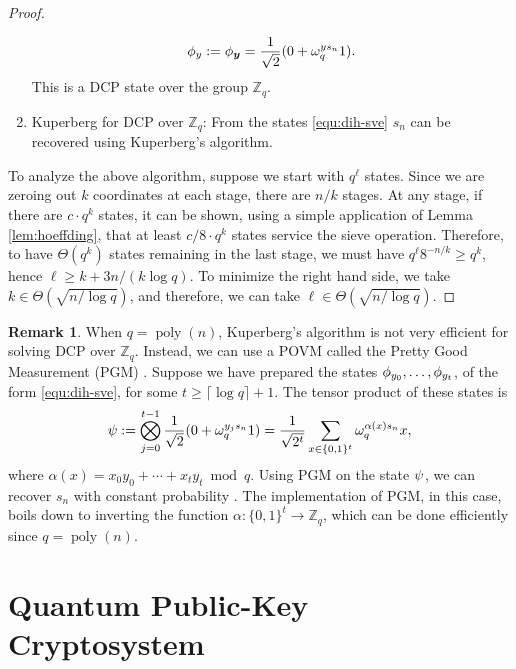 \documentclass[11pt]{article}
\theoremstyle{plain}
\theoremstyle{definition}
\newtheorem*{remark}{Remark}
\DeclareMathOperator{\poly}{poly}
\let\ket\relax
\DeclarePairedDelimiter{\ket}{\lvert}{\rangle}
\def\Z{\mathbb{Z}}
\begin{document}
\begin{proof}
\begin{enumerate}[leftmargin = *, font = \bfseries]
    \begin{equation}
        \label{equ:dih-sve}
        \ket{\phi_y} := \ket{\phi_{\bm{y}}} = \frac{1}{\sqrt{2}}(\ket{0} + \omega_q^{ys_n}\ket{1}).
    \end{equation}
    This is a DCP state over the group $\Z_q$.
    \item Kuperberg for DCP over $\Z_q$: From the states \eqref{equ:dih-sve} $s_n$ can be recovered using Kuperberg's algorithm.
    \end{enumerate}
    To analyze the above algorithm, suppose we start with $q^\ell$ states. Since we are zeroing out $k$ coordinates at each stage, there are $n / k$ stages. At any stage, if there are $c \cdot q^k$ states, it can be shown, using a simple application of Lemma \ref{lem:hoeffding}, that at least $c / 8 \cdot q^k$ states service the sieve operation. Therefore, to have $\Theta(q^k)$ states remaining in the last stage, we must have $q^\ell 8^{-n / k} \ge q^k$, hence $\ell \ge k + 3n / (k\log q)$. To minimize the right hand side, we take $k \in \Theta(\sqrt{n / \log q})$, and therefore, we can take $\ell \in \Theta(\sqrt{n / \log q})$.
\end{proof}
\begin{remark}
    When $q = \poly(n)$, Kuperberg's algorithm is not very efficient for solving DCP over $\Z_q$. Instead, we can use a POVM called the Pretty Good Measurement (PGM) \cite{hausladen1994pretty}. Suppose we have prepared the states $\ket{\phi_{y_0}}, \dots, \ket{\phi_{y_t}}$, of the form \eqref{equ:dih-sve}, for some $t \ge \lceil \log q \rceil + 1$. The tensor product of these states is
    \[ \ket{\psi} := \bigotimes_{j = 0}^{t - 1} \frac{1}{\sqrt{2}}(\ket{0} + \omega_q^{y_js_n}\ket{1}) = \frac{1}{\sqrt{2^t}} \sum_{x \in \{0, 1\}^t} \omega_q^{\alpha(x)s_n} \ket{x}, \]
    where $\alpha(x) = x_0y_0 + \cdots + x_ty_t \bmod q$. Using PGM on the state $\ket{\psi}$, we can recover $s_n$ with constant probability \cite{bacon2005optimal}. The implementation of PGM, in this case, boils down to inverting the function $\alpha: \{0, 1\}^t \rightarrow \Z_q$, which can be done efficiently since $q = \poly(n)$.   
\end{remark}






\section{Quantum Public-Key Cryptosystem}
\label{sec:public-key-enc}
\end{document}
